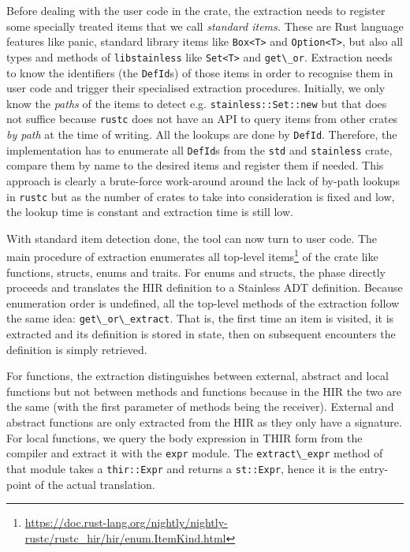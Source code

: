 Before dealing with the user code in the crate, the extraction needs to
register some specially treated items that we call \emph{standard
items.} These are Rust language features like panic, standard library
items like \passthrough{\lstinline!Box<T>!} and
\passthrough{\lstinline!Option<T>!}, but also all types and methods of
\passthrough{\lstinline!libstainless!} like
\passthrough{\lstinline!Set<T>!} and \passthrough{\lstinline!get\_or!}.
Extraction needs to know the identifiers (the
\passthrough{\lstinline!DefId!}s) of those items in order to recognise
them in user code and trigger their specialised extraction procedures.
Initially, we only know the \emph{paths} of the items to detect e.g.
\passthrough{\lstinline!stainless::Set::new!} but that does not suffice
because \passthrough{\lstinline!rustc!} does not have an API to query
items from other crates \emph{by path} at the time of writing. All the
lookups are done by \passthrough{\lstinline!DefId!}. Therefore, the
implementation has to enumerate all \passthrough{\lstinline!DefId!}s
from the \passthrough{\lstinline!std!} and
\passthrough{\lstinline!stainless!} crate, compare them by name to the
desired items and register them if needed. This approach is clearly a
brute-force work-around around the lack of by-path lookups in
\passthrough{\lstinline!rustc!} but as the number of crates to take into
consideration is fixed and low, the lookup time is constant and
extraction time is still low.

With standard item detection done, the tool can now turn to user code.
The main procedure of extraction enumerates all top-level
items\footnote{\url{https://doc.rust-lang.org/nightly/nightly-rustc/rustc_hir/hir/enum.ItemKind.html}}
of the crate like functions, structs, enums and traits. For enums and
structs, the phase directly proceeds and translates the HIR definition
to a Stainless ADT definition. Because enumeration order is undefined,
all the top-level methods of the extraction follow the same idea:
\passthrough{\lstinline!get\_or\_extract!}. That is, the first time an
item is visited, it is extracted and its definition is stored in state,
then on subsequent encounters the definition is simply retrieved.

For functions, the extraction distinguishes between external, abstract
and local functions but not between methods and functions because in the
HIR the two are the same (with the first parameter of methods being the
receiver). External and abstract functions are only extracted from the
HIR as they only have a signature. For local functions, we query the
body expression in THIR form from the compiler and extract it with the
\passthrough{\lstinline!expr!} module. The
\passthrough{\lstinline!extract\_expr!} method of that module takes a
\passthrough{\lstinline!thir::Expr!} and returns a
\passthrough{\lstinline!st::Expr!}, hence it is the entry-point of the
actual translation.

